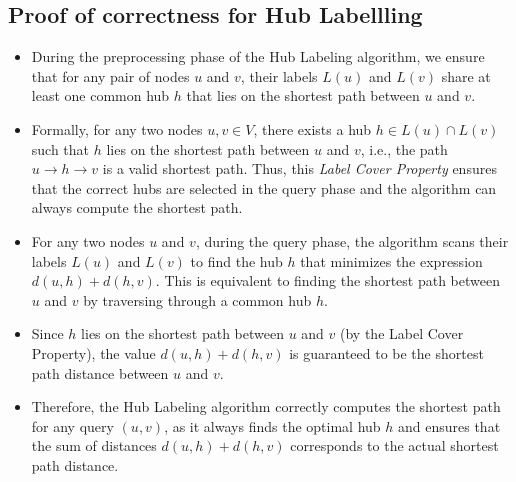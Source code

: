 \begin{appendices}
\section{Proof of correctness for Hub Labellling}\label{appendix:Hub Labelling:correctness}
	\begin{itemize}
		\item During the preprocessing phase of the Hub Labeling algorithm, we ensure that for any pair of nodes $ u $ and $ v $, their labels $ L(u) $ and $ L(v) $ share at least one common hub $ h $ that lies on the shortest path between $ u $ and $ v $.
		\item Formally, for any two nodes $ u, v \in V $, there exists a hub $ h \in L(u) \cap L(v) $ such that $ h $ lies on the shortest path between $ u $ and $ v $, i.e., the path $ u \to h \to v $ is a valid shortest path. Thus, this \textit{Label Cover Property} ensures that the correct hubs are selected in the query phase and the algorithm can always compute the shortest path.
		\item For any two nodes $ u $ and $ v $, during the query phase, the algorithm scans their labels $ L(u) $ and  $ L(v) $ to find the hub $ h $ that minimizes the expression $ d(u, h) + d(h, v) $. This is equivalent to finding the shortest path between $ u $  and $ v $ by traversing through a common hub $ h $.
		\item Since $ h $ lies on the shortest path between $ u $ and $ v $ (by the Label Cover Property), the value $ d(u, h) + d(h, v) $ is guaranteed to be the shortest path distance between $ u $ and $ v $.
		\item Therefore, the Hub Labeling algorithm correctly computes the shortest path for any query $ (u, v) $, as it always finds the optimal hub $ h $ and ensures that the sum of distances $ d(u, h) + d(h, v) $ corresponds to the actual shortest path distance.
	\end{itemize}


\end{appendices}
